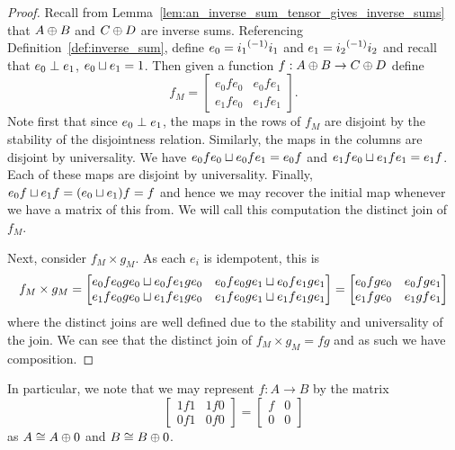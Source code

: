 \begin{proof}
  Recall from Lemma~\ref{lem:an_inverse_sum_tensor_gives_inverse_sums} that $A\oplus B$ and $C\oplus D$ are
  inverse sums. Referencing Definition~\ref{def:inverse_sum}, define $e_0 = {i_1}^{(-1)}i_1$ and $e_1
  = {i_2}^{(-1)}i_2$ and recall that $e_0 \perp e_1$, $e_0 \sqcup e_1 = 1$. Then given a function
  $f:A\oplus B \to C\oplus D$ define
  \[ f_M =
     \begin{bmatrix}
       e_0 f e_0 & e_0 f e_1 \\
       e_1 f e_0 & e_1 f e_1
      \end{bmatrix}.
  \]
  Note first that since $e_0 \perp e_1$, the maps in the rows of $f_M$ are disjoint by the
  stability of the disjointness relation. Similarly, the maps in the columns are disjoint by
  universality. We have $e_0 f e_0 \sqcup e_0 f e_1 = e_0 f$ and $e_1 f e_0 \sqcup e_1 f e_1 = e_1
  f$. Each of these maps are disjoint by universality. Finally, $e_0 f \sqcup e_1 f = (e_0 \sqcup
  e_1) f = f$ and hence we may recover the initial map whenever we have a matrix of this from.
  We will call this computation the distinct join of $f_M$.

  Next, consider $f_M \times g_M$. As each $e_i$ is idempotent, this is
  \[ f_M \times g_M =
     \begin{bmatrix}
       e_0 f e_0 g e_0 \sqcup e_0 f e_1 g e_0 & e_0 f e_0 g e_1 \sqcup e_0 f e_1 g e_1 \\
       e_1 f e_0 g e_0 \sqcup e_1 f e_1 g e_0 & e_1 f e_0 g e_1 \sqcup e_1 f e_1 g e_1
      \end{bmatrix}
      =
     \begin{bmatrix}
       e_0 f g e_0  & e_0 f  g e_1  \\
       e_1 f  g e_0 & e_1  g f e_1
      \end{bmatrix}
  \]
  where the distinct joins are well defined due to the stability and universality of the join.
  We can see that the distinct join of $f_M \times g_M = f g$ and as such we have composition.

\end{proof}

In particular, we note that we may represent $f:A\to B$ by the matrix
\[
  \begin{bmatrix}
    1f1& 1f 0 \\ 0 f 1 & 0 f 0
  \end{bmatrix}
  =
  \begin{bmatrix}
    f& 0 \\ 0 & 0
  \end{bmatrix}
\]
as $A \cong A\oplus0$ and $B \cong B\oplus0$.

